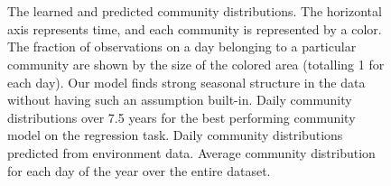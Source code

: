 \begin{figure}
    \centering
    \\
    \\

    \caption{The learned and predicted community distributions. The horizontal axis represents time, and each community is represented by a color. The fraction of observations on a day belonging to a particular community are shown by the size of the colored area (totalling 1 for each day). Our model finds strong seasonal structure in the data without having such an assumption built-in.
    \protect{} Daily community distributions over 7.5 years for the best performing community model on the regression task.
    \protect{} Daily community distributions predicted from environment data.
    \protect{} Average community distribution for each day of the year over the entire dataset.
    }
    \label{fig:plankton-mvco-theta}
\end{figure}

